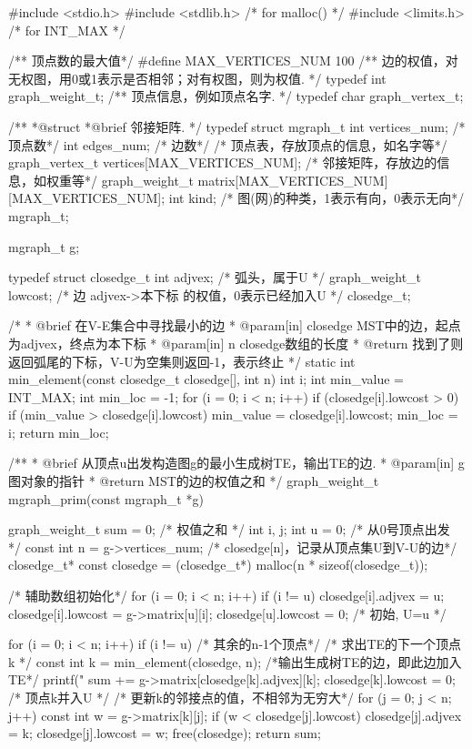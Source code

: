 \begin{Codex}[label=mgraph_prim1.c]
#include <stdio.h>
#include <stdlib.h>  /* for malloc() */
#include <limits.h>  /* for INT_MAX */

/** 顶点数的最大值*/
#define MAX_VERTICES_NUM 100
/** 边的权值，对无权图，用0或1表示是否相邻；对有权图，则为权值. */
typedef int graph_weight_t;
/** 顶点信息，例如顶点名字. */
typedef char graph_vertex_t;

/**
 *@struct
 *@brief 邻接矩阵.
 */
typedef struct mgraph_t {
    int vertices_num; /* 顶点数*/
    int edges_num; /* 边数*/
    /* 顶点表，存放顶点的信息，如名字等*/
    graph_vertex_t vertices[MAX_VERTICES_NUM];
    /* 邻接矩阵，存放边的信息，如权重等*/
    graph_weight_t matrix[MAX_VERTICES_NUM][MAX_VERTICES_NUM];
    int kind; /* 图(网)的种类，1表示有向，0表示无向*/
} mgraph_t;

mgraph_t g;

typedef struct closedge_t {
    int adjvex; /* 弧头，属于U */
    graph_weight_t lowcost; /* 边 adjvex->本下标 的权值，0表示已经加入U */
} closedge_t;

/*
 * @brief 在V-E集合中寻找最小的边
 * @param[in] closedge MST中的边，起点为adjvex，终点为本下标
 * @param[in] n closedge数组的长度
 * @return 找到了则返回弧尾的下标，V-U为空集则返回-1，表示终止
 */
static int min_element(const closedge_t closedge[], int n) {
    int i;
    int min_value = INT_MAX;
    int min_loc = -1;
    for (i = 0; i < n; i++)
        if (closedge[i].lowcost > 0) {
            if (min_value > closedge[i].lowcost) {
                min_value = closedge[i].lowcost;
                min_loc = i;
            }
        }
    return min_loc;
}

/**
 * @brief 从顶点u出发构造图g的最小生成树TE，输出TE的边.
 * @param[in] g 图对象的指针
 * @return MST的边的权值之和
 */
graph_weight_t mgraph_prim(const mgraph_t *g) {
    graph_weight_t sum = 0; /* 权值之和 */
    int i, j;
    int u = 0; /* 从0号顶点出发 */
    const int n = g->vertices_num;
    /* closedge[n]，记录从顶点集U到V-U的边*/
    closedge_t* const closedge = (closedge_t*) malloc(n * sizeof(closedge_t));

    /* 辅助数组初始化*/
    for (i = 0; i < n; i++) if (i != u) {
        closedge[i].adjvex = u;
        closedge[i].lowcost = g->matrix[u][i];
    }
    closedge[u].lowcost = 0; /* 初始, U={u} */

    for (i = 0; i < n; i++) if (i != u) { /* 其余的n-1个顶点*/
        /* 求出TE的下一个顶点k */
        const int k = min_element(closedge, n);
        /*输出生成树TE的边，即此边加入TE*/
        printf("%
        sum += g->matrix[closedge[k].adjvex][k];
        closedge[k].lowcost = 0; /* 顶点k并入U */
        /* 更新k的邻接点的值，不相邻为无穷大*/
        for (j = 0; j < n; j++) {
            const int w = g->matrix[k][j];
            if (w < closedge[j].lowcost) {
                closedge[j].adjvex = k;
                closedge[j].lowcost = w;
            }
        }
    }
    free(closedge);
    return sum;
}


\end{Codex}
